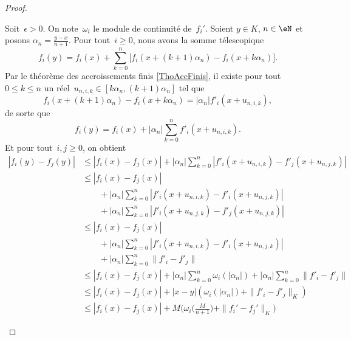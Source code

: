 \begin{proof}
\begin{subproof}
  Soit~$\epsilon > 0$. On note~$\omega_i$ le module de continuité de~$f_i'$. Soient $y\in K$, $n \in \eN$ et posons $\alpha_n = \frac{y-x}{n+1}$.
  Pour tout~$i \geq 0$, nous avons la somme télescopique
  \begin{equation}
      f_i(y) = f_i(x) + \sum_{k=0}^n \Big[  f_i(x+(k+1)\alpha_n) - f_i(x+k\alpha_n) \Big].
  \end{equation}
  Par le théorème des accroissements finis \ref{ThoAccFinis}, il existe pour tout~$0\leq k\leq n$
  un réel~$u_{n,i,k} \in [k\alpha_n,(k+1)\alpha_n]$ tel que
  \begin{equation}
    f_i(x+(k+1)\alpha_n) - f_i(x+k\alpha_n) = |\alpha_n| f'_i(x+ u_{n,i,k}),
  \end{equation}
  de sorte que
  \begin{equation}
    f_i(y) = f_i(x) + |\alpha_n| \sum_{k=0}^n  f'_i(x+ u_{n,i,k}).
  \end{equation}
  Et pour tout~$i,j \geq 0$, on obtient
  \begin{subequations}      \label{SUBEQSooUYFTooWPVfWt}
      \begin{align}
    \left| f_i(y) - f_j(y) \right| &\leq \left| f_i(x) - f_j(x) \right| + |\alpha_n| \sum_{k=0}^n \left| f'_i(x+ u_{n,i,k}) - f'_j(x+u_{n,j,k}) \right|\\
    &\leq | f_i(x)-f_j(x) |\\
    &\qquad+|\alpha_n|\sum_{k=0}^n \left| f'_i(x+ u_{n,i,k}) - f'_i(x+u_{n,j,k}) \right| \nonumber  \\
    &  \qquad +  |\alpha_n|\sum_{k=0}^n\left| f'_i(x+ u_{n,j,k}) - f'_j(x+u_{n,j,k}) \right| \nonumber\\
    &\leq | f_i(x)-f_j(x) |      \label{EQooYMHKooDFYPIf}\\     
    &\qquad+ |\alpha_n|\sum_{k=0}^n \left| f'_i(x+ u_{n,i,k}) - f'_i(x+u_{n,j,k}) \right|\nonumber\\
    &\qquad + |\alpha_n|\sum_{k=0}^n  \| f'_i-f'_j \|   \nonumber \\
    &\leq  | f_i(x)-f_j(x) |+|\alpha_n|\sum_{k=0}^n  \omega_i(|\alpha_n|) + |\alpha_n|\sum_{k=0}^n  \| f'_i-f'_j \|        \label{EQooGHDOooMMNXdj}\\
    &\leq  \left| f_i(x) - f_j(x) \right| + |x-y| \left(\omega_i(|\alpha_n|) + \|f'_i-f'_j\|_K \right)      \label{EQooZCFIooNDojBX}         \\
    &\leq | f_i(x)-f_j(x) |+M\Big( \omega_i\big( \frac{ M }{ n+1 } \big)+\| f_i'-f_j' \|_K \Big)        \label{SUBEQooISWEooBfnJVN}
      \end{align}

\end{subequations}
\end{subproof}
\end{proof}
